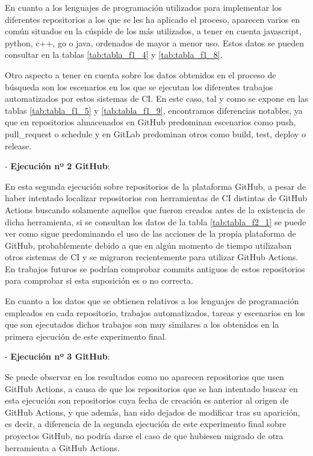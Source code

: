 En cuanto a los lenguajes de programación utilizados para implementar los diferentes repositorios a los que se les ha aplicado el proceso, aparecen varios en común situados en la cúspide de los más utilizados, a tener en cuenta javascript, python, c++, go o java, ordenados de mayor a menor uso. Estos datos se pueden consultar en la tablas \ref{tab:tabla_f1_4} y \ref{tab:tabla_f1_8}.

Otro aspecto a tener en cuenta sobre los datos obtenidos en el proceso de búsqueda son los escenarios en los que se ejecutan los diferentes trabajos automatizados por estos sistemas de CI. En este caso, tal y como se expone en las tablas \ref{tab:tabla_f1_5} y \ref{tab:tabla_f1_9}, encontramos diferencias notables, ya que en repositorios almacenados en GitHub predominan escenarios como push, pull\_request o schedule y en GitLab predominan otros como build, test, deploy o release.

- \textbf{Ejecución nº 2 GitHub}:

En esta segunda ejecución sobre repositorios de la plataforma GitHub, a pesar de haber intentado localizar repositorios con herramientas de CI distintas de GitHub Actions buscando solamente aquellos que fueron creados antes de la existencia de dicha herramienta, si se consultan los datos de la tabla \ref{tab:tabla_f2_1} se puede ver como sigue predominando el uso de las acciones de la propia plataforma de GitHub, probablemente debido a que en algún momento de tiempo utilizaban otros sistemas de CI y se migraron recientemente para utilizar GitHub Actions. En trabajos futuros se podrían comprobar commits antiguos de estos repositorios para comprobar si esta suposición es o no correcta.

En cuanto a los datos que se obtienen relativos a los lenguajes de programación empleados en cada repositorio, trabajos automatizados, tareas y escenarios en los que son ejecutados dichos trabajos son muy similares a los obtenidos en la primera ejecución de este experimento final.

- \textbf{Ejecución nº 3 GitHub}:

Se puede observar en los resultados como no aparecen repositorios que usen GitHub Actions, a causa de que los repositorios que se han intentado buscar en esta ejecución son repositorios cuya fecha de creación es anterior al origen de GitHub Actions, y que además, han sido dejados de modificar tras su aparición, es decir, a diferencia de la segunda ejecución de este experimento final sobre proyectos GitHub, no podría darse el caso de que hubiesen migrado de otra herramienta a GitHub Actions.

